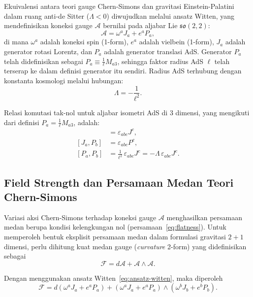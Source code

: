 Ekuivalensi antara teori gauge Chern-Simons dan gravitasi Einstein-Palatini dalam ruang anti-de Sitter ($\Lambda < 0$) diwujudkan melalui ansatz Witten, yang mendefinisikan koneksi gauge $\mathcal{A}$ bernilai pada aljabar Lie $\mathfrak{so}(2,2)$:
\begin{equation} \label{eq:ansatz-witten}
    \mathcal{A} = \omega^a J_a + e^a P_a,
\end{equation}
di mana $\omega^a$ adalah koneksi spin (1-form), $e^a$ adalah vielbein (1-form), $J_a$ adalah generator rotasi Lorentz, dan $P_a$ adalah generator translasi AdS. Generator $P_a$ telah didefinisikan sebagai $P_a \equiv \frac{1}{\ell} M_{a3}$, sehingga faktor radius AdS $\ell$ telah terserap ke dalam definisi generator itu sendiri. Radius AdS terhubung dengan konstanta kosmologi melalui hubungan:
\begin{equation}
    \Lambda = -\frac{1}{\ell^2}.
\end{equation}
 
\noindent Relasi komutasi tak-nol untuk aljabar isometri AdS di 3 dimensi, yang mengikuti dari definisi $P_a = \frac{1}{\ell} M_{a3}$, adalah:
\begin{align}
    [J_a, J_b] &= \varepsilon_{abc} J^c, \nonumber \\
    [J_a, P_b] &= \varepsilon_{abc} P^c, \label{w41-eq:komutator} \\
    [P_a, P_b] &= \frac{1}{\ell^2}\,\varepsilon_{abc} J^c = -\Lambda\,\varepsilon_{abc} J^c. \nonumber
\end{align}
 
\subsection{Field Strength dan Persamaan Medan Teori Chern-Simons}
 
Variasi aksi Chern-Simons terhadap koneksi gauge $\mathcal{A}$ menghasilkan persamaan medan berupa kondisi kelengkungan nol (persamaan~\eqref{eq:flatness}). Untuk memperoleh bentuk eksplisit persamaan medan dalam formulasi gravitasi $2+1$ dimensi, perlu dihitung kuat medan gauge (\textit{curvature} 2-form) yang didefinisikan sebagai
\begin{equation}
    \mathcal{F}=d\mathcal{A}+\mathcal{A}\wedge\mathcal{A}.
\end{equation}
 
\noindent Dengan menggunakan ansatz Witten~\eqref{eq:ansatz-witten}, maka diperoleh
\begin{equation}
    \mathcal{F}
    =
    d(\omega^a J_a + e^a P_a)
    +
    (\omega^a J_a + e^a P_a)
    \wedge
    (\omega^b J_b + e^b P_b).
\end{equation}
 
